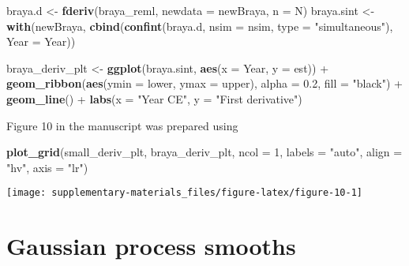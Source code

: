 \documentclass[12pt,]{article}
\newenvironment{Shaded}{\begin{snugshade}}{\end{snugshade}}
\newcommand{\KeywordTok}[1]{\textcolor[rgb]{0.13,0.29,0.53}{\textbf{{#1}}}}
\newcommand{\DataTypeTok}[1]{\textcolor[rgb]{0.13,0.29,0.53}{{#1}}}
\newcommand{\DecValTok}[1]{\textcolor[rgb]{0.00,0.00,0.81}{{#1}}}
\newcommand{\FloatTok}[1]{\textcolor[rgb]{0.00,0.00,0.81}{{#1}}}
\newcommand{\StringTok}[1]{\textcolor[rgb]{0.31,0.60,0.02}{{#1}}}
\newcommand{\NormalTok}[1]{{#1}}
\begin{document}
\begin{Shaded}
\begin{Highlighting}[]
\NormalTok{braya.d <-}\StringTok{ }\KeywordTok{fderiv}\NormalTok{(braya_reml, }\DataTypeTok{newdata =} \NormalTok{newBraya, }\DataTypeTok{n =} \NormalTok{N)}
\NormalTok{braya.sint <-}\StringTok{ }\KeywordTok{with}\NormalTok{(newBraya,}
                   \KeywordTok{cbind}\NormalTok{(}\KeywordTok{confint}\NormalTok{(braya.d, }\DataTypeTok{nsim =} \NormalTok{nsim,}
                                 \DataTypeTok{type =} \StringTok{"simultaneous"}\NormalTok{),}
                         \DataTypeTok{Year =} \NormalTok{Year))}

\NormalTok{braya_deriv_plt <-}\StringTok{ }\KeywordTok{ggplot}\NormalTok{(braya.sint, }\KeywordTok{aes}\NormalTok{(}\DataTypeTok{x =} \NormalTok{Year, }\DataTypeTok{y =} \NormalTok{est)) +}
\StringTok{    }\KeywordTok{geom_ribbon}\NormalTok{(}\KeywordTok{aes}\NormalTok{(}\DataTypeTok{ymin =} \NormalTok{lower, }\DataTypeTok{ymax =} \NormalTok{upper),}
                \DataTypeTok{alpha =} \FloatTok{0.2}\NormalTok{, }\DataTypeTok{fill =} \StringTok{"black"}\NormalTok{) +}
\StringTok{    }\KeywordTok{geom_line}\NormalTok{() +}
\StringTok{    }\KeywordTok{labs}\NormalTok{(}\DataTypeTok{x =} \StringTok{"Year CE"}\NormalTok{, }\DataTypeTok{y =} \StringTok{"First derivative"}\NormalTok{)}
\end{Highlighting}
\end{Shaded}

Figure 10 in the manuscript was prepared using

\begin{Shaded}
\begin{Highlighting}[]
\KeywordTok{plot_grid}\NormalTok{(small_deriv_plt, braya_deriv_plt, }\DataTypeTok{ncol =} \DecValTok{1}\NormalTok{, }\DataTypeTok{labels =} \StringTok{"auto"}\NormalTok{,}
          \DataTypeTok{align =} \StringTok{"hv"}\NormalTok{, }\DataTypeTok{axis =} \StringTok{"lr"}\NormalTok{)}
\end{Highlighting}
\end{Shaded}

\begin{center}\texttt{[image: supplementary-materials\_files/figure-latex/figure-10-1]} \end{center}

\section{Gaussian process smooths}\label{gaussian-process-smooths}
\end{document}
